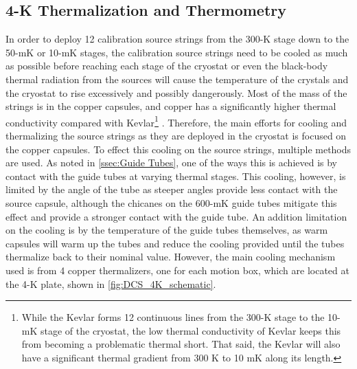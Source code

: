 \subsection*{4-K Thermalization and Thermometry}
\label{ssec:Thermalization_and_Thermometry}
In order to deploy 12 calibration source strings from the 300-K stage down to the 50-mK or 10-mK stages, the calibration source strings need to be cooled as much as possible before reaching each stage of the cryostat or even the black-body thermal radiation from the sources will cause the temperature of the crystals and the cryostat to rise excessively and possibly dangerously.
Most of the mass of the strings is in the copper capsules, and copper has a significantly higher thermal conductivity compared with Kevlar\footnote{While the Kevlar forms 12 continuous lines from the 300-K stage to the 10-mK stage of the cryostat, the low thermal conductivity of Kevlar keeps this from becoming a problematic thermal short.
That said, the Kevlar will also have a significant thermal gradient from 300 K to 10 mK along its length.} \cite{Cu_thermal_conductivity, VENTURA2009735}.
Therefore, the main efforts for cooling and thermalizing the source strings as they are deployed in the cryostat is focused on the copper capsules.
To effect this cooling on the source strings, multiple methods are used. 
As noted in \autoref{ssec:Guide Tubes}, one of the ways this is achieved is by contact with the guide tubes at varying thermal stages.
This cooling, however, is limited by the angle of the tube as steeper angles provide less contact with the source capsule, although the chicanes on the 600-mK guide tubes mitigate this effect and provide a stronger contact with the guide tube.
An addition limitation on the cooling is by the temperature of the guide tubes themselves, as warm capsules will warm up the tubes and reduce the cooling provided until the tubes thermalize back to their nominal value.
However, the main cooling mechanism used is from 4 copper thermalizers, one for each motion box, which are located at the 4-K plate, shown in \autoref{fig:DCS_4K_schematic}.

